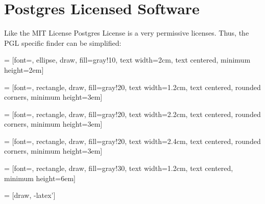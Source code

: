 %
%
%
%
%



\section{Postgres Licensed Software}

Like the MIT License Postgres License is a very permissive licenses. Thus, the
PGL specific finder can be simplified:

 = [font=\small, ellipse, draw, fill=gray!10, 
    text width=2cm, text centered, minimum height=2em]

 = [font=\footnotesize, rectangle, draw, fill=gray!20, 
    text width=1.2cm, text centered, rounded corners, minimum height=3em]

 = [font=\footnotesize, rectangle, draw, fill=gray!20, 
    text width=2.2cm, text centered, rounded corners, minimum height=3em]

 = [font=\footnotesize, rectangle, draw, fill=gray!20, 
    text width=2.4cm, text centered, rounded corners, minimum height=3em]
    
 = [font=\tiny, rectangle, draw, fill=gray!30, 
    text width=1.2cm, text centered, minimum height=6em]

 = [draw, -latex']

